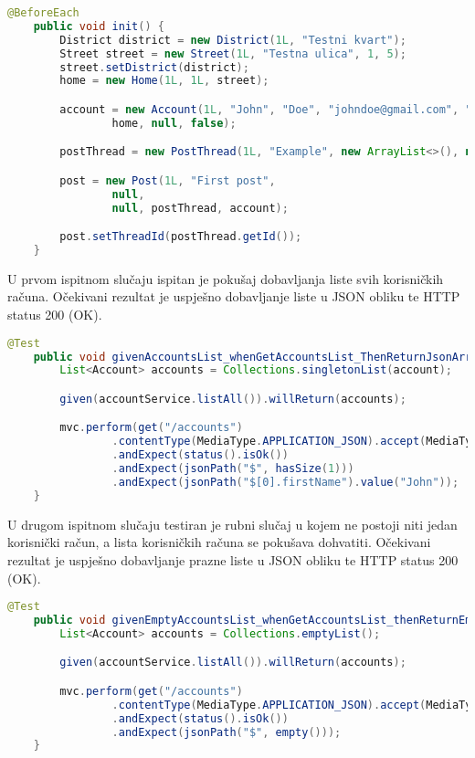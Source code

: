 			\begin{lstlisting}[language=Java, breaklines=true]
    @BeforeEach
    public void init() {
        District district = new District(1L, "Testni kvart");
        Street street = new Street(1L, "Testna ulica", 1, 5);
        street.setDistrict(district);
        home = new Home(1L, 1L, street);

        account = new Account(1L, "John", "Doe", "johndoe@gmail.com", "pass123",
                home, null, false);

        postThread = new PostThread(1L, "Example", new ArrayList<>(), null, district);

        post = new Post(1L, "First post",
                null,
                null, postThread, account);

        post.setThreadId(postThread.getId());
    }
			\end{lstlisting}

			U prvom ispitnom slučaju ispitan je pokušaj dobavljanja liste svih korisničkih računa.
			Očekivani rezultat je uspješno dobavljanje liste u JSON obliku te HTTP status 200 (OK).

			\begin{lstlisting}[language=Java, breaklines=true]
    @Test
    public void givenAccountsList_whenGetAccountsList_ThenReturnJsonArray() throws Exception {
        List<Account> accounts = Collections.singletonList(account);

        given(accountService.listAll()).willReturn(accounts);

        mvc.perform(get("/accounts")
                .contentType(MediaType.APPLICATION_JSON).accept(MediaType.APPLICATION_JSON))
                .andExpect(status().isOk())
                .andExpect(jsonPath("$", hasSize(1)))
                .andExpect(jsonPath("$[0].firstName").value("John"));
    }
			\end{lstlisting}

			U drugom ispitnom slučaju testiran je rubni slučaj u kojem ne postoji niti jedan korisnički račun, a lista
			korisničkih računa se pokušava dohvatiti. Očekivani rezultat je uspješno dobavljanje prazne liste u JSON obliku te HTTP status 200 (OK).

			\begin{lstlisting}[language=Java, breaklines=true]
	@Test
    public void givenEmptyAccountsList_whenGetAccountsList_thenReturnEmptyJsonArray() throws Exception {
        List<Account> accounts = Collections.emptyList();

        given(accountService.listAll()).willReturn(accounts);

        mvc.perform(get("/accounts")
                .contentType(MediaType.APPLICATION_JSON).accept(MediaType.APPLICATION_JSON))
                .andExpect(status().isOk())
                .andExpect(jsonPath("$", empty()));
    }
			\end{lstlisting}

